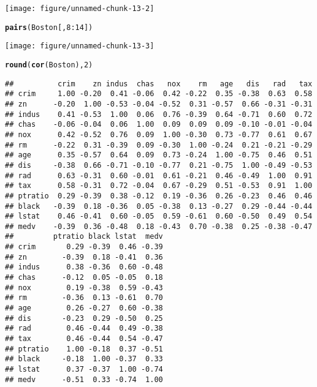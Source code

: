 \documentclass{article}\usepackage[]{graphicx}\usepackage[]{color}
\makeatletter
\def\maxwidth{ %
  \ifdim\Gin@nat@width>\linewidth
    \linewidth
  \else
    \Gin@nat@width
  \fi
}
\newcommand{\hlnum}[1]{\textcolor[rgb]{0.686,0.059,0.569}{#1}}%
\newcommand{\hlopt}[1]{\textcolor[rgb]{0,0,0}{#1}}%
\newcommand{\hlstd}[1]{\textcolor[rgb]{0.345,0.345,0.345}{#1}}%
\newcommand{\hlkwd}[1]{\textcolor[rgb]{0.737,0.353,0.396}{\textbf{#1}}}%
\newenvironment{kframe}{%
 \def\at@end@of@kframe{}%
 \ifinner\ifhmode%
  \def\at@end@of@kframe{\end{minipage}}%
  \begin{minipage}{\columnwidth}%
 \fi\fi%
 \def\FrameCommand##1{\hskip\@totalleftmargin \hskip-\fboxsep
 \colorbox{shadecolor}{##1}\hskip-\fboxsep
     \hskip-\linewidth \hskip-\@totalleftmargin \hskip\columnwidth}%
 \MakeFramed {\advance\hsize-\width
   \@totalleftmargin\z@ \linewidth\hsize
   \@setminipage}}%
 {\par\unskip\endMakeFramed%
 \at@end@of@kframe}
\newenvironment{knitrout}{}{} %
\makeatother
\begin{document}
\begin{enumerate}[(a)]
\begin{knitrout}
\begin{kframe}
\end{kframe}
\texttt{[image: figure/unnamed-chunk-13-2]} 
\begin{kframe}\begin{alltt}
\hlkwd{pairs}\hlstd{(Boston[,}\hlnum{8}\hlopt{:}\hlnum{14}\hlstd{])}
\end{alltt}
\end{kframe}
\texttt{[image: figure/unnamed-chunk-13-3]} 
\begin{kframe}\begin{alltt}
\hlkwd{round}\hlstd{(}\hlkwd{cor}\hlstd{(Boston),}\hlnum{2}\hlstd{)}
\end{alltt}
\begin{verbatim}
##          crim    zn indus  chas   nox    rm   age   dis   rad   tax
## crim     1.00 -0.20  0.41 -0.06  0.42 -0.22  0.35 -0.38  0.63  0.58
## zn      -0.20  1.00 -0.53 -0.04 -0.52  0.31 -0.57  0.66 -0.31 -0.31
## indus    0.41 -0.53  1.00  0.06  0.76 -0.39  0.64 -0.71  0.60  0.72
## chas    -0.06 -0.04  0.06  1.00  0.09  0.09  0.09 -0.10 -0.01 -0.04
## nox      0.42 -0.52  0.76  0.09  1.00 -0.30  0.73 -0.77  0.61  0.67
## rm      -0.22  0.31 -0.39  0.09 -0.30  1.00 -0.24  0.21 -0.21 -0.29
## age      0.35 -0.57  0.64  0.09  0.73 -0.24  1.00 -0.75  0.46  0.51
## dis     -0.38  0.66 -0.71 -0.10 -0.77  0.21 -0.75  1.00 -0.49 -0.53
## rad      0.63 -0.31  0.60 -0.01  0.61 -0.21  0.46 -0.49  1.00  0.91
## tax      0.58 -0.31  0.72 -0.04  0.67 -0.29  0.51 -0.53  0.91  1.00
## ptratio  0.29 -0.39  0.38 -0.12  0.19 -0.36  0.26 -0.23  0.46  0.46
## black   -0.39  0.18 -0.36  0.05 -0.38  0.13 -0.27  0.29 -0.44 -0.44
## lstat    0.46 -0.41  0.60 -0.05  0.59 -0.61  0.60 -0.50  0.49  0.54
## medv    -0.39  0.36 -0.48  0.18 -0.43  0.70 -0.38  0.25 -0.38 -0.47
##         ptratio black lstat  medv
## crim       0.29 -0.39  0.46 -0.39
## zn        -0.39  0.18 -0.41  0.36
## indus      0.38 -0.36  0.60 -0.48
## chas      -0.12  0.05 -0.05  0.18
## nox        0.19 -0.38  0.59 -0.43
## rm        -0.36  0.13 -0.61  0.70
## age        0.26 -0.27  0.60 -0.38
## dis       -0.23  0.29 -0.50  0.25
## rad        0.46 -0.44  0.49 -0.38
## tax        0.46 -0.44  0.54 -0.47
## ptratio    1.00 -0.18  0.37 -0.51
## black     -0.18  1.00 -0.37  0.33
## lstat      0.37 -0.37  1.00 -0.74
## medv      -0.51  0.33 -0.74  1.00
\end{verbatim}
\end{kframe}
\end{knitrout}

\end{enumerate}
\end{document}
